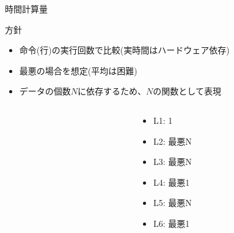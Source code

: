 \documentclass{beamer}
\begin{document}
\begin{frame}[fragile]{時間計算量}{}
\begin{block}{方針}
\begin{itemize}%
\item 命令(行)の実行回数で比較(実時間はハードウェア依存)
\item 最悪の場合を想定(平均は困難)
\item データの個数$N$に依存するため、$N$の関数として表現
\end{itemize}
\end{block}

\begin{columns}
\begin{column}{0.7\textwidth}
\end{column}
\begin{column}{0.25\textwidth}

\begin{itemize}%
\item L1: 1
\item L2: 最悪N
\item L3: 最悪N
\item L4: 最悪1
\item L5: 最悪N
\item L6: 最悪1
\end{itemize}
\end{column}
\end{columns}
\end{frame}
\end{document}
